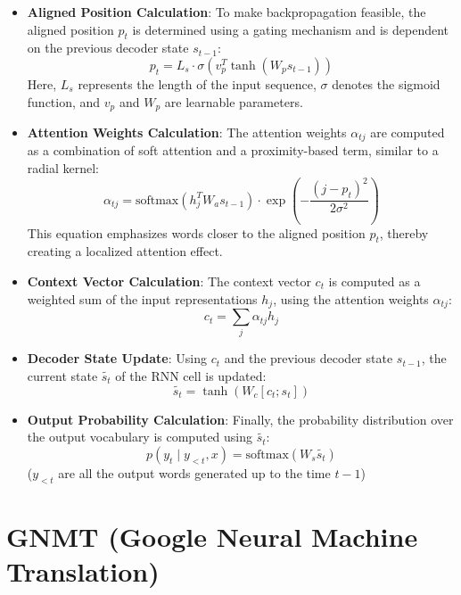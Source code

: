 \begin{itemize}
    
    \item \textbf{Aligned Position Calculation}:
    To make backpropagation feasible, the aligned position $p_t$ is determined using a gating mechanism and is dependent on the previous decoder state $s_{t-1}$:
    $$
    p_t = L_s \cdot \sigma(v^T_p \tanh(W_p s_{t-1}))
    $$
    Here, $L_s$ represents the length of the input sequence, $\sigma$ denotes the sigmoid function, and $v_p$ and $W_p$ are learnable parameters.
    \vspace{0.25cm}
    
    \item \textbf{Attention Weights Calculation}:
    The attention weights $\alpha_{tj}$ are computed as a combination of soft attention and a proximity-based term, similar to a radial kernel:
    $$
    \alpha_{tj} = \text{softmax}(h_j^T W_a s_{t-1}) \cdot \exp\left(-\frac{(j - p_t)^2}{2\sigma^2}\right)
    $$
    This equation emphasizes words closer to the aligned position $p_t$, thereby creating a localized attention effect.
    \vspace{0.25cm}
    
    \item \textbf{Context Vector Calculation}:
    The context vector $c_t$ is computed as a weighted sum of the input representations $h_j$, using the attention weights $\alpha_{tj}$:
    $$\label{eq:local-attention}
    c_t = \sum_{j} \alpha_{tj} h_j
    $$
    
    \item \textbf{Decoder State Update}:
    Using $c_t$ and the previous decoder state $s_{t-1}$, the current state $\widetilde{s_t}$ of the RNN cell is updated:
    $$
    \widetilde{s_t} = \tanh(W_c [c_t; s_t])
    $$
    
    \item \textbf{Output Probability Calculation}:
    Finally, the probability distribution over the output vocabulary is computed using $\widetilde{s_t}$:
    $$
    p(y_t \mid y_{<t}, x) = \text{softmax}(W_s \widetilde{s_t})
    $$
    ($y_{<t}$ are all the output words generated up to the time $t-1$)

\end{itemize}


\section{GNMT (Google Neural Machine Translation)}

